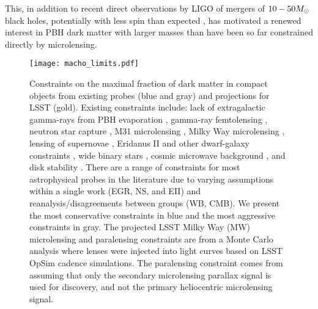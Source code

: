 This, in addition to recent direct observations by LIGO of mergers of $10-50 M_\odot$ black holes, potentially with less spin than expected \citep{1602.03837, LIGOScientific:2018b, LIGOScientific:2018a},
has motivated a renewed interest in PBH dark matter with larger masses than have been so far constrained directly by microlensing.

\begin{figure}[t]
\centering
\texttt{[image: macho\_limits.pdf]}
\caption{\label{fig:macho_constraints}
    Constraints on the maximal fraction of dark matter in compact objects from existing probes (blue and gray) and projections for LSST (gold).
    Existing constraints include: lack of extragalactic gamma-rays from PBH evaporation \citep[EGR;][]{0912.5297, 1604.05349}, gamma-ray femtolensing \citep[GF;][]{1204.2056}, neutron star capture \citep[NS][]{1301.4984}, M31 microlensing \citep[M31ML][]{1701.02151}, Milky Way microlensing \citep[MWML;][]{2007A&A...469..387T, 2001ApJ...550L.169A, 2009MNRAS.397.1228W}, lensing of supernovae \citep[LSN;][]{1712.02240,1712.06574}, Eridanus II and other dwarf-galaxy constraints \citep[EII;][]{2016ApJ...824L..31B, 1611.05052}, wide binary stars \citep[WB;][]{2009MNRAS.396L..11Q, 2004ApJ...601..311Y}, cosmic microwave background \citep[CMB;][]{2017PhRvD..95d3534A, 2008ApJ...680..829R}, and disk stability \citep[DS;][]{1985ApJ...299..633L, 1994ApJ...437..184X}.
    There are a range of constraints for most astrophysical probes in the literature due to varying assumptions within a single work (EGR, NS, and EII) and reanalysis/disagreements between groups (WB, CMB).
    We present the most conservative constraints in blue and the most aggressive constraints in gray.
    The projected LSST Milky Way (MW) microlensing and paralensing constraints are from a Monte Carlo analysis where lenses were injected into light curves based on LSST OpSim cadence simulations. 
    The paralensing constraint comes from assuming that only the secondary microlensing parallax signal is used for discovery, and not the primary heliocentric microlensing signal.
}
\end{figure}

